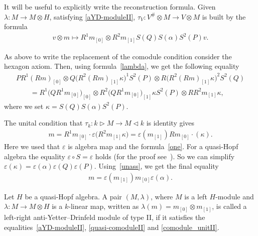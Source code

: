 \documentclass[pdftex]{sigma}
\newcommand{\la}{\triangleright}
\newcommand{\ra}{\triangleleft}
\numberwithin{equation}{section}
\begin{document}
 \begin{Remark}
It will be useful to explicitly write the reconstruction formula. Given $\lambda\colon M \rightarrow M\otimes H$, satisfying \eqref{aYD-moduleII}, $\tau_V \colon V^\# \otimes M \rightarrow V \otimes M$ is built by the formula
\begin{gather}\label{lambda}
v \otimes m \mapsto R^1 m_{[0]} \otimes R^2 m_{[1]} S(Q) S(\alpha) S^2(P) v.
\end{gather}
 \end{Remark}

As above to write the replacement of the comodule condition consider the hexagon axiom. Then, using formula~\eqref{lambda}, we get the following equality
 \begin{gather}
 PR^1(Rm)_{[0]} \otimes Q\big(R^2(Rm)_{[1]} \kappa \big)^1S^2(P) \otimes R \big(R^2(Rm)_{[1]} \kappa \big)^2 S^2(Q)\nonumber\\
\qquad{} =R^1 \big(QR^1m_{[0]}\big)_{[0]} \otimes R^2 \big(QR^1m_{[0]}\big)_{[1]} \kappa S^2(P) \otimes RR^2m_{[1]} \kappa, \label{quasi-comoduleII}
 \end{gather}
 where we set $\kappa = S(Q) S(\alpha) S^2(P)$.

 The unital condition that $\tau_k\colon k \la M \rightarrow M \ra k$ is identity gives
 \begin{gather*}
 m = R^1 m_{[0]} \cdot \varepsilon\big(R^2 m_{[1]} \kappa\big) = \varepsilon(m_{[1]}) R m_{[0]} \cdot(\kappa).
 \end{gather*}
 Here we used that $\varepsilon$ is algebra map and the formula~\eqref{one}. For a quasi-Hopf algebra the equality $\varepsilon \circ S = \varepsilon $ holds (for the proof see~\cite{Drinfeld}). So we can simplify $\varepsilon(\kappa) = \varepsilon(\alpha) \varepsilon(Q) \varepsilon (P) $. Using~\eqref{unass}, we get the final equality
\begin{gather} \label{comodule_unitII}
 m = \varepsilon(m_{[1]}) m_{[0]} \varepsilon(\alpha).
\end{gather}

 \begin{Definition}Let $H$ be a quasi-Hopf algebra. A pair $(M, \lambda)$, where $M$ is a left $H$-module and $\lambda\colon M \rightarrow M\otimes H$ is a $k$-linear map, written as $\lambda(m) = m_{[0]} \otimes m_{[1]} $, is called a left-right anti-Yetter--Drinfeld module of type II, if it satisfies the equalities~\eqref{aYD-moduleII}, \eqref{quasi-comoduleII} and \eqref{comodule_unitII}.
 \end{Definition}
\end{document}
